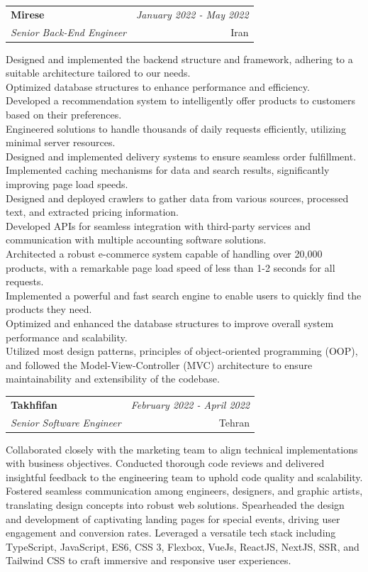 \documentclass[a4paper,10pt]{article}
\makeatletter
\newcommand{\resumeSubheading}[4]{
	\vspace{0.5mm}\item
	\begin{tabular*}{0.98\textwidth}[t]{l@{\extracolsep{\fill}}r}
		\textbf{#1} & \textit{\footnotesize{#4}} \\
		\textit{\footnotesize{#3}} &  \footnotesize{#2}\\
	\end{tabular*}
	\vspace{-2.4mm}
}
\newcommand{\resumeItemListStart}{\begin{justify}\begin{itemize}[leftmargin=3ex, rightmargin=2ex, noitemsep,labelsep=1.2mm,itemsep=0mm]\small}
\newcommand{\resumeItemListEnd}{\end{itemize}\end{justify}\vspace{-2mm}}
\makeatother
\begin{document}
\vspace{-1mm}
\resumeSubheading
{Mirese}{Iran}
{Senior Back-End Engineer}{January 2022 - May 2022}
\resumeItemListStart
Designed and implemented the backend structure and framework, adhering to a suitable architecture tailored to our needs. \\
Optimized database structures to enhance performance and efficiency. \\
Developed a recommendation system to intelligently offer products to customers based on their preferences. \\
Engineered solutions to handle thousands of daily requests efficiently, utilizing minimal server resources. \\
Designed and implemented delivery systems to ensure seamless order fulfillment. \\
Implemented caching mechanisms for data and search results, significantly improving page load speeds. \\
Designed and deployed crawlers to gather data from various sources, processed text, and extracted pricing information. \\
Developed APIs for seamless integration with third-party services and communication with multiple accounting software solutions. \\
Architected a robust e-commerce system capable of handling over 20,000 products, with a remarkable page load speed of less than 1-2 seconds for all requests. \\
Implemented a powerful and fast search engine to enable users to quickly find the products they need. \\
Optimized and enhanced the database structures to improve overall system performance and scalability. \\
Utilized most design patterns, principles of object-oriented programming (OOP), and followed the Model-View-Controller (MVC) architecture to ensure maintainability and extensibility of the codebase.
\resumeItemListEnd

\vspace{-1mm}
\resumeSubheading
{Takhfifan}{Tehran}
{Senior Software Engineer}{February 2022 - April 2022}
\resumeItemListStart
Collaborated closely with the marketing team to align technical implementations with business objectives. Conducted thorough code reviews and delivered insightful feedback to the engineering team to uphold code quality and scalability. Fostered seamless communication among engineers, designers, and graphic artists, translating design concepts into robust web solutions. Spearheaded the design and development of captivating landing pages for special events, driving user engagement and conversion rates. Leveraged a versatile tech stack including TypeScript, JavaScript, ES6, CSS 3, Flexbox, VueJs, ReactJS, NextJS, SSR, and Tailwind CSS to craft immersive and responsive user experiences.
\resumeItemListEnd
\end{document}
